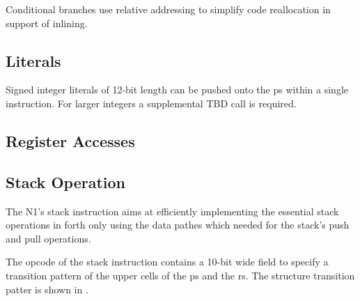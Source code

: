 Conditional branches use relative addressing to simplify code reallocation in support
of inlining.

\subsection{Literals}
\label{opcodes:literal}

Signed integer \glspl{literal} of 12-bit length can be pushed onto the \gls{ps} within
a single instruction. For larger integers a supplemental TBD \gls{call} is required.

\subsection{Register Accesses}
\label{opcodes:regacc}


\subsection{Stack Operation}
\label{opcodes:stack}

The N1's stack instruction aims at efficiently implementing the essential stack operations
in \Gls{forth} only using the data pathes which needed for the stack's push and pull
operations.

The opcode of the stack instruction contains a 10-bit wide field to specify a transition
pattern of the upper \glspl{cell} of the \gls{ps} and the \gls{rs}. 
The structure transition patter is shown in .
    
